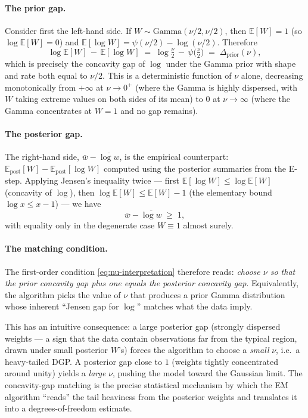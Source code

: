 \documentclass[11pt, a4paper, oneside]{article}
\begin{document}
\paragraph{The prior gap.}
Consider first the left-hand side. If
$W \sim \text{Gamma}(\nu/2, \nu/2)$, then
$\mathbb{E}[W] = 1$ (so $\log \mathbb{E}[W] = 0$) and
$\mathbb{E}[\log W] = \psi(\nu/2) - \log(\nu/2)$. Therefore
\[
\log \mathbb{E}[W] \,-\, \mathbb{E}[\log W] \;=\; \log\!\tfrac{\nu}{2} \,-\, \psi\!\big(\tfrac{\nu}{2}\big) \;=\; \Delta_{\text{prior}}(\nu),
\]
which is precisely the concavity gap of $\log$ under the Gamma prior
with shape and rate both equal to $\nu/2$. This is a deterministic
function of $\nu$ alone, decreasing monotonically from $+\infty$ at
$\nu \to 0^+$ (where the Gamma is highly dispersed, with $W$ taking
extreme values on both sides of its mean) to $0$ at $\nu \to \infty$
(where the Gamma concentrates at $W = 1$ and no gap remains).

\paragraph{The posterior gap.}
The right-hand side, $\bar{w} - \overline{\log w}$, is the empirical
counterpart: $\mathbb{E}_{\text{post}}[W] - \mathbb{E}_{\text{post}}[\log W]$
computed using the posterior summaries from the E-step. Applying
Jensen's inequality twice — first $\mathbb{E}[\log W] \leq \log \mathbb{E}[W]$
(concavity of $\log$), then $\log \mathbb{E}[W] \leq \mathbb{E}[W] - 1$
(the elementary bound $\log x \leq x - 1$) — we have
\[
\bar{w} - \overline{\log w} \;\geq\; 1,
\]
with equality only in the degenerate case $W \equiv 1$ almost surely.

\paragraph{The matching condition.}
The first-order condition \eqref{eq:nu-interpretation} therefore reads:
\emph{choose $\nu$ so that the prior concavity gap plus one equals
the posterior concavity gap}. Equivalently, the algorithm picks the
value of $\nu$ that produces a prior Gamma distribution whose
inherent ``Jensen gap for $\log$'' matches what the data imply.

This has an intuitive consequence: a large posterior gap (strongly
dispersed weights — a sign that the data contain observations far
from the typical region, drawn under small posterior $W$'s) forces
the algorithm to choose a \emph{small} $\nu$, i.e.\ a heavy-tailed
DGP. A posterior gap close to $1$ (weights tightly concentrated
around unity) yields a \emph{large} $\nu$, pushing the model toward
the Gaussian limit. The concavity-gap matching is the precise
statistical mechanism by which the EM algorithm ``reads'' the tail
heaviness from the posterior weights and translates it into a
degrees-of-freedom estimate.
\end{document}
